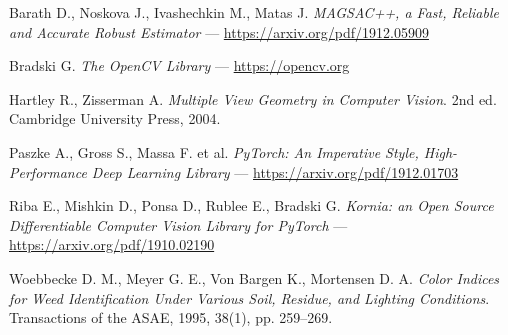 

\usetikzlibrary{arrows.meta,positioning,babel}





Barath D., Noskova J., Ivashechkin M., Matas J. {\it MAGSAC++, a Fast, Reliable and Accurate Robust Estimator} --- \url{https://arxiv.org/pdf/1912.05909}

Bradski G. {\it The OpenCV Library} --- \url{https://opencv.org}

Hartley R., Zisserman A. {\it Multiple View Geometry in Computer Vision}. 2nd ed. Cambridge University Press, 2004.

Paszke A., Gross S., Massa F. et al. {\it PyTorch: An Imperative Style, High-Performance Deep Learning Library} --- \url{https://arxiv.org/pdf/1912.01703}

Riba E., Mishkin D., Ponsa D., Rublee E., Bradski G. {\it Kornia: an Open Source Differentiable Computer Vision Library for PyTorch} --- \url{https://arxiv.org/pdf/1910.02190}

Woebbecke D. M., Meyer G. E., Von Bargen K., Mortensen D. A. {\it Color Indices for Weed Identification Under Various Soil, Residue, and Lighting Conditions}. Transactions of the ASAE, 1995, 38(1), pp. 259--269.

